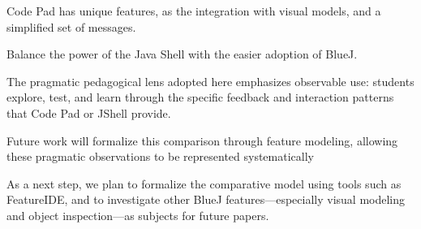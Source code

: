 \documentclass{article}
\begin{document}
Code Pad has unique features, as the integration with visual models, and a simplified set of messages. 


Balance the power of the Java Shell with the easier adoption of BlueJ.

The pragmatic pedagogical lens adopted here emphasizes observable use: students explore, test, and learn through the specific feedback and interaction patterns that Code Pad or JShell provide.

Future work will formalize this comparison through feature modeling, allowing these pragmatic observations to be represented systematically

As a next step, we plan to formalize the comparative model using tools such as FeatureIDE, and to investigate other BlueJ features—especially visual modeling and object inspection—as subjects for future papers.





\end{document}

